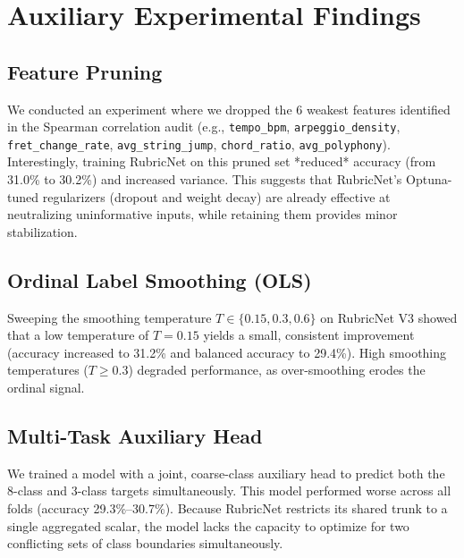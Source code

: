 \section{Auxiliary Experimental Findings}

\subsection{Feature Pruning}
We conducted an experiment where we dropped the 6 weakest features identified in the Spearman correlation audit (e.g., \texttt{tempo\_bpm}, \texttt{arpeggio\_density}, \texttt{fret\_change\_rate}, \texttt{avg\_string\_jump}, \texttt{chord\_ratio}, \texttt{avg\_polyphony}). Interestingly, training RubricNet on this pruned set *reduced* accuracy (from 31.0\% to 30.2\%) and increased variance. This suggests that RubricNet's Optuna-tuned regularizers (dropout and weight decay) are already effective at neutralizing uninformative inputs, while retaining them provides minor stabilization.

\subsection{Ordinal Label Smoothing (OLS)}
Sweeping the smoothing temperature $T \in \{0.15, 0.3, 0.6\}$ on RubricNet V3 showed that a low temperature of \textbf{$T=0.15$} yields a small, consistent improvement (accuracy increased to 31.2\% and balanced accuracy to 29.4\%). High smoothing temperatures ($T \ge 0.3$) degraded performance, as over-smoothing erodes the ordinal signal.

\subsection{Multi-Task Auxiliary Head}
We trained a model with a joint, coarse-class auxiliary head to predict both the 8-class and 3-class targets simultaneously. This model performed worse across all folds (accuracy 29.3\%–30.7\%). Because RubricNet restricts its shared trunk to a single aggregated scalar, the model lacks the capacity to optimize for two conflicting sets of class boundaries simultaneously.
